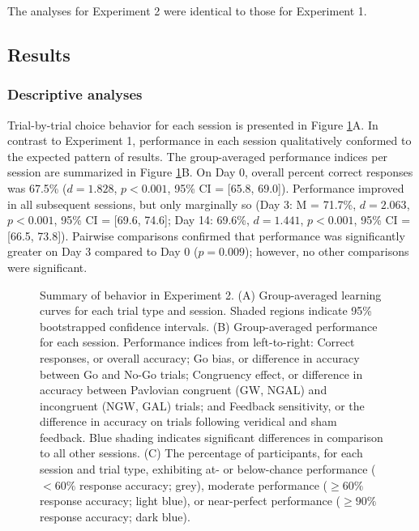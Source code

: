 \documentclass[a4paper,12pt]{article}
\begin{document}
\begin{refsection}[main]
The analyses for Experiment 2 were identical to those for Experiment 1. 

\subsection*{Results}

\subsubsection*{Descriptive analyses}

Trial-by-trial choice behavior for each session is presented in Figure \ref{fig:exp02_behavior}A. In contrast to Experiment 1, performance in each session qualitatively conformed to the expected pattern of results. The group-averaged performance indices per session are summarized in Figure \ref{fig:exp02_behavior}B. On Day 0, overall percent correct responses was 67.5\% ($d = 1.828$, $p < 0.001$, 95\% CI = [65.8, 69.0]). Performance improved in all subsequent sessions, but only marginally so (Day 3: M = 71.7\%, $d = 2.063$, $p < 0.001$, 95\% CI = [69.6, 74.6]; Day 14: 69.6\%, $d = 1.441$, $p < 0.001$, 95\% CI = [66.5, 73.8]). Pairwise comparisons confirmed that performance was significantly greater on Day 3 compared to Day 0 ($p = 0.009$); however, no other comparisons were significant.

\begin{figure}[hpt]
    \centerline{}
    \caption{Summary of behavior in Experiment 2. (A) Group-averaged learning curves for each trial type and session. Shaded regions indicate 95\% bootstrapped confidence intervals. (B) Group-averaged performance for each session. Performance indices from left-to-right: Correct responses, or overall accuracy; Go bias, or difference in accuracy between Go and No-Go trials; Congruency effect, or difference in accuracy between Pavlovian congruent (GW, NGAL) and incongruent (NGW, GAL) trials; and Feedback sensitivity, or the difference in accuracy on trials following veridical and sham feedback. Blue shading indicates significant differences in comparison to all other sessions. (C) The percentage of participants, for each session and trial type, exhibiting at- or below-chance performance ($< 60\%$ response accuracy; grey), moderate performance ($\geq 60\%$ response accuracy; light blue), or near-perfect performance ($\geq 90\%$ response accuracy; dark blue).}
    \label{fig:exp02_behavior}
\end{figure}


\end{refsection}
\end{document}
